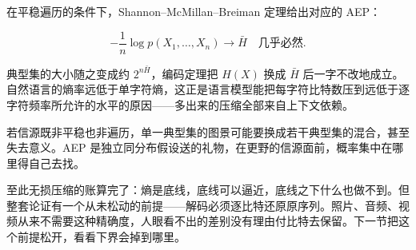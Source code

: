 在平稳遍历的条件下，Shannon--McMillan--Breiman 定理给出对应的 AEP：

\[
-\frac1n\log p(X_1,\dots,X_n)\longrightarrow\bar H\quad\text{几乎必然}.
\]

典型集的大小随之变成约 \(2^{n\bar H}\)，编码定理把 \(H(X)\) 换成 \(\bar H\) 后一字不改地成立。自然语言的熵率远低于单字符熵，这正是语言模型能把每字符比特数压到远低于逐字符频率所允许的水平的原因——多出来的压缩全部来自上下文依赖。

若信源既非平稳也非遍历，单一典型集的图景可能要换成若干典型集的混合，甚至失去意义。AEP 是独立同分布假设送的礼物，在更野的信源面前，概率集中在哪里得自己去找。

至此无损压缩的账算完了：熵是底线，底线可以逼近，底线之下什么也做不到。但整套论证有一个从未松动的前提——解码必须逐比特还原原序列。照片、音频、视频从来不需要这种精确度，人眼看不出的差别没有理由付比特去保留。下一节把这个前提松开，看看下界会掉到哪里。
